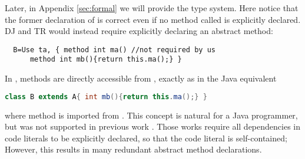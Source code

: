 Later, in Appendix \ref{sec:formal} we will provide the type
system. 
Here notice that the former declaration of \Q@B@ is correct even if
no method called \Q@ma@ is explicitly declared.
DJ and TR would instead require explicitly declaring an abstract \Q@ma@ method:
\saveSpace\saveSpace
\begin{lstlisting}
  B=Use ta, { method int ma() //not required by us
      method int mb(){return this.ma();} }
\end{lstlisting}
\saveSpace\saveSpace
\noindent
In \name, methods are directly accessible from \Q@ta@, exactly as in the Java equivalent
\saveSpace\saveSpace\begin{lstlisting}[language=Java]
  class B extends A{ int mb(){return this.ma();} }  
\end{lstlisting}
\saveSpace\saveSpace
where method \Q@ma@ is imported from \Q@A@.
This concept is natural for a Java programmer, but was not supported
in previous work \cite{BETTINI2013521,deep}. Those works require all
dependencies in code literals to be explicitly declared, so that the
code literal is self-contained;
However, this results in
many redundant abstract method declarations.

